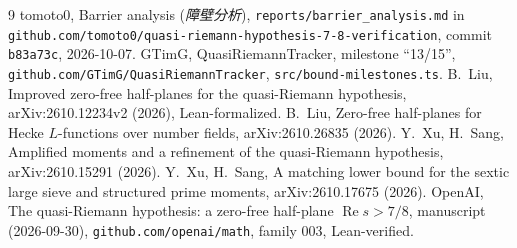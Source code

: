 \documentclass[11pt]{article}
\renewcommand{\Re}{\operatorname{Re}}
\begin{document}
\begin{thebibliography}{9}
 tomoto0, Barrier analysis (\emph{障壁分析}), \texttt{reports/barrier\_analysis.md} in \texttt{github.com/tomoto0/quasi-riemann-hypothesis-7-8-verification}, commit \texttt{b83a73c}, 2026-10-07.
 GTimG, QuasiRiemannTracker, milestone ``13/15'', \texttt{github.com/GTimG/QuasiRiemannTracker}, \texttt{src/bound-milestones.ts}.
 B.~Liu, Improved zero-free half-planes for the quasi-Riemann hypothesis, arXiv:2610.12234v2 (2026), Lean-formalized.
 B.~Liu, Zero-free half-planes for Hecke $L$-functions over number fields, arXiv:2610.26835 (2026).
 Y.~Xu, H.~Sang, Amplified moments and a refinement of the quasi-Riemann hypothesis, arXiv:2610.15291 (2026).
 Y.~Xu, H.~Sang, A matching lower bound for the sextic large sieve and structured prime moments, arXiv:2610.17675 (2026).
 OpenAI, The quasi-Riemann hypothesis: a zero-free half-plane $\Re s>7/8$, manuscript (2026-09-30), \texttt{github.com/openai/math}, family 003, Lean-verified.
\end{thebibliography}
\end{document}
